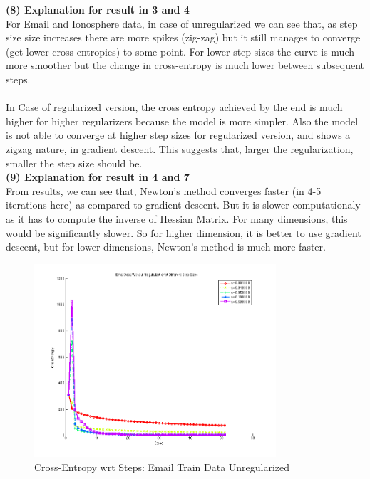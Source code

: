 \documentclass[paper=a4, fontsize=11pt]{scrartcl} %
\numberwithin{equation}{section} %
\numberwithin{figure}{section} %
\numberwithin{table}{section} %
\begin{document}
\textbf{(8) Explanation for result in 3 and 4}\\
For Email and Ionosphere data, in case of unregularized we can see that, as step size size increases there are more spikes (zig-zag) but it still manages to converge (get lower cross-entropies) to some point. For lower step sizes the curve is much more smoother but the change in cross-entropy is much lower between subsequent steps.\\\\
In Case of regularized version, the cross entropy achieved by the end is much higher for higher regularizers because the model is more simpler. Also the model is not able to converge at higher step sizes for regularized version, and shows a zigzag nature, in gradient descent. This suggests that, larger the regularization, smaller the step size should be.\\

\textbf{(9) Explanation for result in 4 and 7}\\
From results, we can see that, Newton's method converges faster (in 4-5 iterations here) as compared to gradient descent. But it is slower computationaly as it has to compute the inverse of Hessian Matrix. For many dimensions, this would be significantly slower. So for higher dimension, it is better to use gradient descent, but for lower dimensions, Newton's method is much more faster.



\newpage


\begin{figure}[h!]
  \caption{Cross-Entropy wrt Steps: Email Train Data Unregularized}
  \centering
    \includegraphics[width=0.8\textwidth]{../Pics/Fig1_email_unreg.png}
\end{figure}
\end{document}
